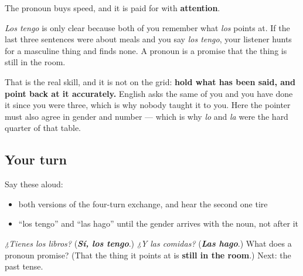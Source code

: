 \begin{grammarlens}[title={Grammar Lens: what a pronoun buys, and what it costs}]
The pronoun buys speed, and it is paid for with \textbf{attention}.

\emph{Los tengo} is only clear because both of you remember what \emph{los} points at. If the last three sentences were about meals and you say \emph{los tengo}, your listener hunts for a masculine thing and finds none. A pronoun is a promise that the thing is still in the room.

That is the real skill, and it is not on the grid: \textbf{hold what has been said, and point back at it accurately.} English asks the same of you and you have done it since you were three, which is why nobody taught it to you. Here the pointer must also agree in gender and number — which is why \emph{lo} and \emph{la} were the hard quarter of that table.
\end{grammarlens}

\subsection*{Your turn}
Say these aloud:

\begin{itemize}
\raggedright
  \item both versions of the four-turn exchange, and hear the second one tire
  \item \textquotedblleft{}los tengo\textquotedblright{} and \textquotedblleft{}las hago\textquotedblright{} until the gender arrives with the noun, not after it
\end{itemize}

\begin{tcolorbox}[breakable,colback=teal!4,colframe=teal!35!black,title={Before you move on}]
\emph{¿Tienes los libros?} (\emph{\textbf{Sí, los tengo}}.) \emph{¿Y las comidas?} (\emph{\textbf{Las hago}}.) What does a pronoun promise? (That the thing it points at is \textbf{still in the room}.) Next: the past tense.
\end{tcolorbox}
